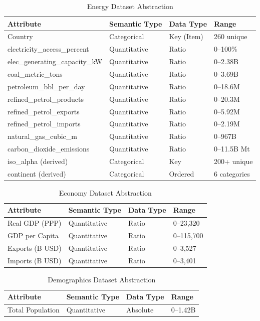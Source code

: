 \documentclass[conference]{IEEEtran}
\begin{document}
\begin{table}[H]
\centering
\caption{Energy Dataset Abstraction}
\label{tab:data_abstraction}
\small
\begin{tabular}{|p{3.7cm}|p{1.5cm}|p{0.9cm}|p{1.4cm}|}
\hline
\textbf{Attribute} & \textbf{Semantic Type} & \textbf{Data Type} & \textbf{Range} \\
\hline
Country & Categorical & Key (Item) & 260 unique \\
electricity\_access\_percent & Quantitative & Ratio & 0--100\% \\
elec\_generating\_capacity\_kW & Quantitative & Ratio & 0--2.38B \\
coal\_metric\_tons & Quantitative & Ratio & 0--3.69B \\
petroleum\_bbl\_per\_day & Quantitative & Ratio & 0--18.6M \\
refined\_petrol\_products & Quantitative & Ratio & 0--20.3M \\
refined\_petrol\_exports & Quantitative & Ratio & 0--5.92M \\
refined\_petrol\_imports & Quantitative & Ratio & 0--2.19M \\
natural\_gas\_cubic\_m & Quantitative & Ratio & 0--967B \\
carbon\_dioxide\_emissions & Quantitative & Ratio & 0--11.5B Mt \\
iso\_alpha (derived) & Categorical & Key & 200+ unique \\
continent (derived) & Categorical & Ordered & 6 categories \\
\hline
\end{tabular}
\end{table}

\begin{table}[H]
\centering
\caption{Economy Dataset Abstraction}
\small
\begin{tabular}{|l|l|l|l|}
\hline
\textbf{Attribute} & \textbf{Semantic Type} & \textbf{Data Type} & \textbf{Range} \\
\hline
Real GDP (PPP) & Quantitative & Ratio & 0--23,320 \\
GDP per Capita & Quantitative & Ratio & 0--115,700 \\
Exports (B USD) & Quantitative & Ratio & 0--3,527 \\
Imports (B USD) & Quantitative & Ratio & 0--3,401 \\
\hline
\end{tabular}
\end{table}

\begin{table}[H]
\centering
\caption{Demographics Dataset Abstraction}
\small
\begin{tabular}{|l|l|l|l|}
\hline
\textbf{Attribute} & \textbf{Semantic Type} & \textbf{Data Type} & \textbf{Range} \\
\hline
Total Population & Quantitative & Absolute & 0--1.42B \\
\hline
\end{tabular}
\end{table}
\end{document}

